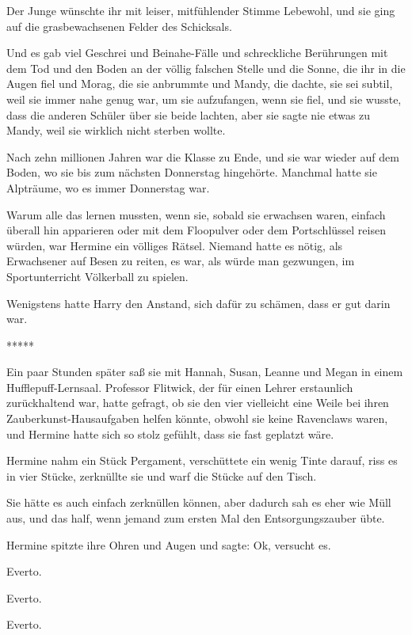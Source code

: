 Der Junge wünschte ihr mit leiser, mitfühlender Stimme Lebewohl, und sie ging
auf die grasbewachsenen Felder des Schicksals.

Und es gab viel Geschrei und Beinahe-Fälle und schreckliche Berührungen mit dem
Tod und den Boden an der völlig falschen Stelle und die Sonne, die ihr in die
Augen fiel und Morag, die sie anbrummte und Mandy, die dachte, sie sei subtil,
weil sie immer nahe genug war, um sie aufzufangen, wenn sie fiel, und sie
wusste, dass die anderen Schüler über sie beide lachten, aber sie sagte nie
etwas zu Mandy, weil sie wirklich nicht sterben wollte.

Nach zehn millionen Jahren war die Klasse zu Ende, und sie war wieder auf dem
Boden, wo sie bis zum nächsten Donnerstag hingehörte. Manchmal hatte sie
Alpträume, wo es immer Donnerstag war.

Warum alle das lernen mussten, wenn sie, sobald sie erwachsen waren, einfach
überall hin apparieren oder mit dem Floopulver oder dem Portschlüssel reisen
würden, war Hermine ein völliges Rätsel. Niemand hatte es nötig, als Erwachsener
auf Besen zu reiten, es war, als würde man gezwungen, im Sportunterricht
Völkerball zu spielen.

Wenigstens hatte Harry den Anstand, sich dafür zu schämen, dass er gut darin
war.

\begin{center}*****\end{center}

Ein paar Stunden später saß sie mit Hannah, Susan, Leanne und Megan in einem
Hufflepuff-Lernsaal. Professor Flitwick, der für einen Lehrer erstaunlich
zurückhaltend war, hatte gefragt, ob sie den vier vielleicht eine Weile bei
ihren Zauberkunst-Hausaufgaben helfen könnte, obwohl sie keine Ravenclaws waren,
und Hermine hatte sich so stolz gefühlt, dass sie fast geplatzt wäre.

Hermine nahm ein Stück Pergament, verschüttete ein wenig Tinte darauf, riss es
in vier Stücke, zerknüllte sie und warf die Stücke auf den Tisch.

Sie hätte es auch einfach zerknüllen können, aber dadurch sah es eher wie Müll
aus, und das half, wenn jemand zum ersten Mal den Entsorgungszauber übte.

Hermine spitzte ihre Ohren und Augen und sagte: \glqq{}Ok, versucht es.\grqq{}

\glqq{}Everto.\grqq{}

\glqq{}Everto.\grqq{}

\glqq{}Everto.\grqq{}

